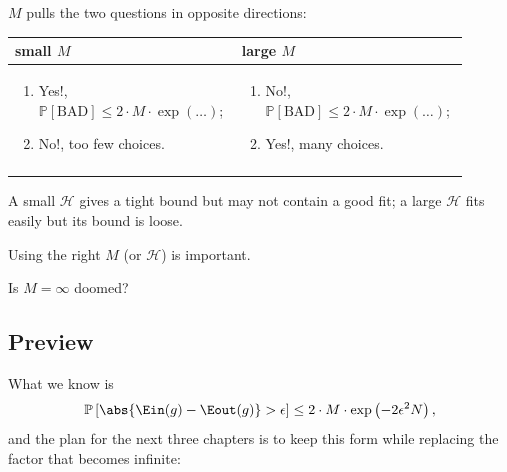 \(M\) pulls the two questions in opposite directions:

\begin{center}
    \begin{tabular}{@{}p{0.45\linewidth}p{0.45\linewidth}@{}}
        \toprule
        \textbf{small \(M\)} & \textbf{large \(M\)}\\
        \midrule
        \begin{enumerate}[leftmargin=*, nosep]
            \item Yes!,
                \(\mathbb{P}\left[ \text{BAD} \right] \le 2 \cdot M \cdot
                \exp(\dots)\);
            \item No!, too few choices.
        \end{enumerate}
        &
        \begin{enumerate}[leftmargin=*, nosep]
            \item No!,
                \(\mathbb{P}\left[ \text{BAD} \right] \le 2 \cdot M \cdot
                \exp(\dots)\);
            \item Yes!, many choices.
        \end{enumerate}\\
        \addlinespace[4pt]
        \bottomrule
    \end{tabular}
\end{center}

A small \(\mathcal{H}\) gives a tight bound but may not contain a good fit; a
large \(\mathcal{H}\) fits easily but its bound is loose.

\begin{moral}
    Using the right \(M\) (or \(\mathcal{H}\)) is important.
\end{moral}

\begin{question}\label{q:doomed}
    Is \(M = \infty\) doomed?
\end{question}

\subsection{Preview}

What we know is
\[
    \mathbb{P}\left[ \abs{\Ein(g) - \Eout(g)} > \epsilon \right]
    \le 2 \cdot M \cdot \exp \left( -2 \epsilon^2 N \right) ,
\]
and the plan for the next three chapters is to keep this form while replacing
the factor that becomes infinite:

